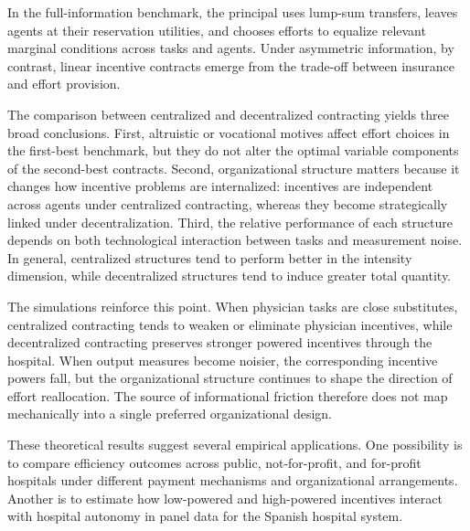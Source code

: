﻿\documentclass[12pt,letterpaper]{article}
\begin{document}
In the full-information benchmark, the principal uses lump-sum transfers, leaves agents at their reservation utilities, and chooses efforts to equalize relevant marginal conditions across tasks and agents. Under asymmetric information, by contrast, linear incentive contracts emerge from the trade-off between insurance and effort provision.

The comparison between centralized and decentralized contracting yields three broad conclusions. First, altruistic or vocational motives affect effort choices in the first-best benchmark, but they do not alter the optimal variable components of the second-best contracts. Second, organizational structure matters because it changes how incentive problems are internalized: incentives are independent across agents under centralized contracting, whereas they become strategically linked under decentralization. Third, the relative performance of each structure depends on both technological interaction between tasks and measurement noise. In general, centralized structures tend to perform better in the intensity dimension, while decentralized structures tend to induce greater total quantity.

The simulations reinforce this point. When physician tasks are close substitutes, centralized contracting tends to weaken or eliminate physician incentives, while decentralized contracting preserves stronger powered incentives through the hospital. When output measures become noisier, the corresponding incentive powers fall, but the organizational structure continues to shape the direction of effort reallocation. The source of informational friction therefore does not map mechanically into a single preferred organizational design.

These theoretical results suggest several empirical applications. One possibility is to compare efficiency outcomes across public, not-for-profit, and for-profit hospitals under different payment mechanisms and organizational arrangements. Another is to estimate how low-powered and high-powered incentives interact with hospital autonomy in panel data for the Spanish hospital system.
\end{document}
